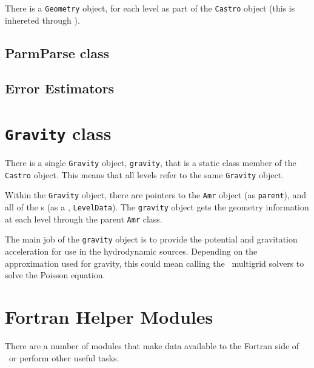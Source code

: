 There is a {\tt Geometry} object,  for each level as part of 
the {\tt Castro} object (this is inhereted through \amrlevel). 



\subsection{ParmParse class}


\subsection{Error Estimators}


\section{{\tt Gravity} class}

There is a single {\tt Gravity} object, {\tt gravity}, that is a
static class member of the {\tt Castro} object.  This means that all
levels refer to the same {\tt Gravity} object.

Within the {\tt Gravity} object, there are pointers to the {\tt Amr}
object (as {\tt parent}), and all of the \amrlevel s (as a \parray,
{\tt LevelData}).  The {\tt gravity} object gets the geometry
information at each level through the parent {\tt Amr} class.


The main job of the {\tt gravity} object is to provide the potential
and gravitation acceleration for use in the hydrodynamic sources.
Depending on the approximation used for gravity, this could mean
calling the \boxlib\ multigrid solvers to solve the Poisson equation.




\section{Fortran Helper Modules}

There are a number of modules that make data available to the Fortran
side of \castro\ or perform other useful tasks.

